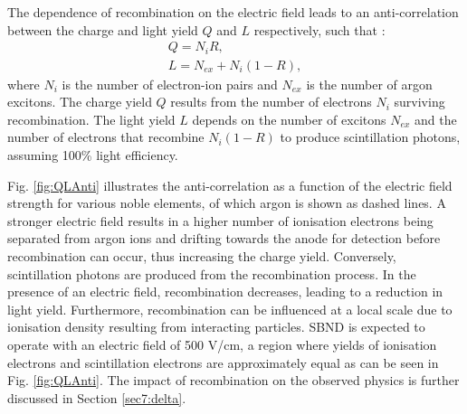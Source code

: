 
The dependence of recombination on the electric field leads to an anti-correlation between the charge and light yield $Q$ and $L$ respectively, such that \cite{Lariat}:
\begin{gather}
        \label{eq:Q}
        Q = N_{i}R, \\ 
        \label{eq:L}
        L = N_{ex} + N_{i}(1 - R),
\end{gather}
where $N_{i}$ is the number of electron-ion pairs and $N_{ex}$ is the number of argon excitons.
The charge yield $Q$ results from the number of electrons $N_i$ surviving recombination.
The light yield $L$ depends on the number of excitons $N_{ex}$ and the number of electrons that recombine $N_{i}(1 - R)$ to produce scintillation photons, assuming 100\% light efficiency. 

Fig. \ref{fig:QLAnti} illustrates the anti-correlation as a function of the electric field strength for various noble elements, of which argon is shown as dashed lines.
A stronger electric field results in a higher number of ionisation electrons being separated from argon ions and drifting towards the anode for detection before recombination can occur, thus increasing the charge yield. 
Conversely, scintillation photons are produced from the recombination process.
In the presence of an electric field, recombination decreases, leading to a reduction in light yield.
Furthermore, recombination can be influenced at a local scale due to ionisation density resulting from interacting particles.
SBND is expected to operate with an electric field of 500 V/cm, a region where yields of ionisation electrons and scintillation electrons are approximately equal as can be seen in Fig. \ref{fig:QLAnti}.
The impact of recombination on the observed physics is further discussed in Section \ref{sec7:delta}.

